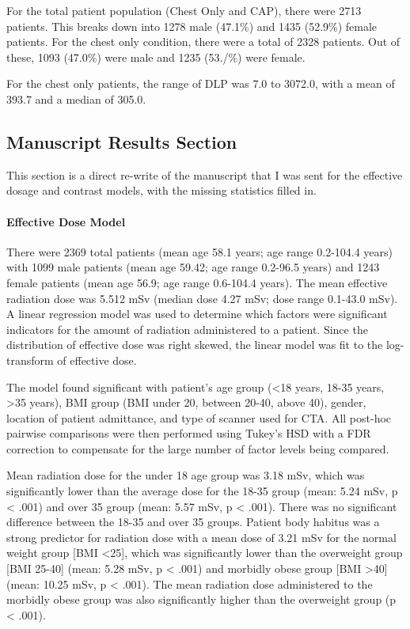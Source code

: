 \documentclass[]{article}
\let\oldparagraph\paragraph
\renewcommand{\paragraph}[1]{\oldparagraph{#1}\mbox{}}
\begin{document}
For the total patient population (Chest Only and CAP), there were 2713
patients. This breaks down into 1278 male (47.1\%) and 1435 (52.9\%)
female patients. For the chest only condition, there were a total of
2328 patients. Out of these, 1093 (47.0\%) were male and 1235 (53./\%)
were female.

For the chest only patients, the range of DLP was 7.0 to 3072.0, with a
mean of 393.7 and a median of 305.0.

\subsection{Manuscript Results
Section}\label{manuscript-results-section}

This section is a direct re-write of the manuscript that I was sent for
the effective dosage and contrast models, with the missing statistics
filled in.

\paragraph{Effective Dose Model}\label{effective-dose-model}

There were 2369 total patients (mean age 58.1 years; age range 0.2-104.4
years) with 1099 male patients (mean age 59.42; age range 0.2-96.5
years) and 1243 female patients (mean age 56.9; age range 0.6-104.4
years). The mean effective radiation dose was 5.512 mSv (median dose
4.27 mSv; dose range 0.1-43.0 mSv). A linear regression model was used
to determine which factors were significant indicators for the amount of
radiation administered to a patient. Since the distribution of effective
dose was right skewed, the linear model was fit to the log-transform of
effective dose.

The model found significant with patient's age group (\textless{}18
years, 18-35 years, \textgreater{}35 years), BMI group (BMI under 20,
between 20-40, above 40), gender, location of patient admittance, and
type of scanner used for CTA. All post-hoc pairwise comparisons were
then performed using Tukey's HSD with a FDR correction to compensate for
the large number of factor levels being compared.

Mean radiation dose for the under 18 age group was 3.18 mSv, which was
significantly lower than the average dose for the 18-35 group (mean:
5.24 mSv, p \textless{} .001) and over 35 group (mean: 5.57 mSv, p
\textless{} .001). There was no significant difference between the 18-35
and over 35 groups. Patient body habitus was a strong predictor for
radiation dose with a mean dose of 3.21 mSv for the normal weight group
{[}BMI \textless{}25{]}, which was significantly lower than the
overweight group {[}BMI 25-40{]} (mean: 5.28 mSv, p \textless{} .001)
and morbidly obese group {[}BMI \textgreater{}40{]} (mean: 10.25 mSv, p
\textless{} .001). The mean radiation dose administered to the morbidly
obese group was also significantly higher than the overweight group (p
\textless{} .001).
\end{document}
